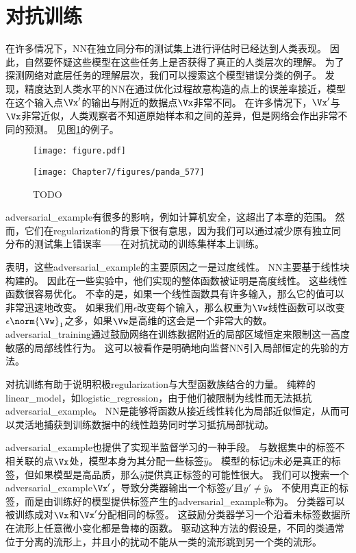 \section{对抗训练}
\label{sec:adversarial_training}
在许多情况下，\gls{NN}在独立同分布的测试集上进行评估时已经达到人类表现。
因此，自然要怀疑这些模型在这些任务上是否获得了真正的人类层次的理解。
为了探测网络对底层任务的理解层次，我们可以搜索这个模型错误分类的例子。
\cite{Szegedy-ICLR2014}发现，精度达到人类水平的\gls{NN}在通过优化过程故意构造的点上的误差率接近，模型在这个输入点$\Vx'$的输出与附近的数据点$\Vx$非常不同。
在许多情况下，$\Vx'$与$\Vx$非常近似，人类观察者不知道原始样本和之间的差异，但是网络会作出非常不同的预测。
见图\ref{fig:chap7_panda_577}的例子。
\begin{figure}[!htb]
\ifOpenSource
\centerline{\texttt{[image: figure.pdf]}}
\else
\centerline{\texttt{[image: Chapter7/figures/panda\_577]}}
\fi
\caption{TODO}
\label{fig:chap7_panda_577}
\end{figure}


\gls{adversarial_example}有很多的影响，例如计算机安全，这超出了本章的范围。
然而，它们在\gls{regularization}的背景下很有意思，因为我们可以通过减少原有独立同分布的测试集上错误率——在对抗扰动的训练集样本上训练\citep{Szegedy-ICLR2014,Goodfellow-2015-adversarial}。


\cite{Goodfellow-2015-adversarial}表明，这些\gls{adversarial_example}的主要原因之一是过度线性。
\gls{NN}主要基于线性块构建的。
因此在一些实验中，他们实现的整体函数被证明是高度线性。
这些线性函数很容易优化。
不幸的是，如果一个线性函数具有许多输入，那么它的值可以非常迅速地改变。
如果我们用$\epsilon$改变每个输入，那么权重为$\Vw$线性函数可以改变$\epsilon \norm{\Vw}_1$之多，如果$\Vw$是高维的这会是一个非常大的数。
\gls{adversarial_training}通过鼓励网络在训练数据附近的局部区域恒定来限制这一高度敏感的局部线性行为。
这可以被看作是明确地向监督\gls{NN}引入局部恒定的先验的方法。

对抗训练有助于说明积极\gls{regularization}与大型函数族结合的力量。
纯粹的\gls{linear_model}，如\gls{logistic_regression}，由于他们被限制为线性而无法抵抗\gls{adversarial_example}。
\gls{NN}是能够将函数从接近线性转化为局部近似恒定，从而可以灵活地捕获到训练数据中的线性趋势同时学习抵抗局部扰动。

\gls{adversarial_example}也提供了实现半监督学习的一种手段。
与数据集中的标签不相关联的点$\Vx$处，模型本身为其分配一些标签$\hat y$。
模型的标记$\hat y$未必是真正的标签，但如果模型是高品质，那么$\hat y$提供真正标签的可能性很大。
我们可以搜索一个\gls{adversarial_example}$\Vx'$，导致分类器输出一个标签$y'$且$y' \neq \hat y$。
不使用真正的标签，而是由训练好的模型提供标签产生的\gls{adversarial_example}称为\citep{miyato2015distributional}。
分类器可以被训练成对$\Vx$和$\Vx'$分配相同的标签。
这鼓励分类器学习一个沿着未标签数据所在流形上任意微小变化都是鲁棒的函数。
驱动这种方法的假设是，不同的类通常位于分离的流形上，并且小的扰动不能从一类的流形跳到另一个类的流形。


